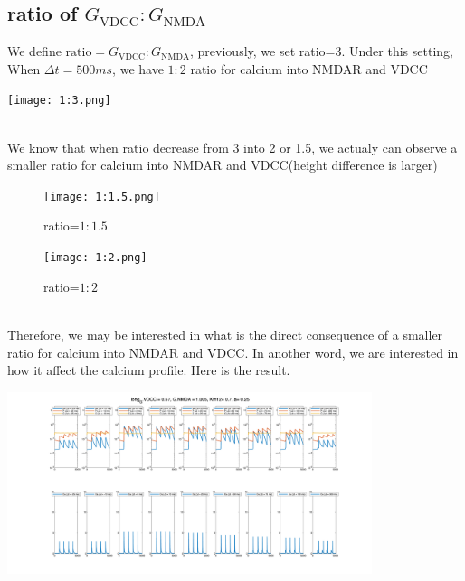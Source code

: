 \documentclass{article}
\begin{document}
\subsection{ratio of $G_{\text{VDCC}}:G_{\text{NMDA}}$}
We define $\text{ratio}=G_{\text{VDCC}}:G_{\text{NMDA}}$, previously, we set ratio=3. Under this setting, When $\Delta t=500ms$, we have $1:2$ ratio for calcium into NMDAR and VDCC\\
\begin{minipage}{\textwidth} %
    \centering
    \texttt{[image: 1:3.png]} %
    \label{fig:a0.25}
\end{minipage}\\
We know that when ratio decrease from 3 into 2 or 1.5, we actualy can observe a smaller ratio for calcium into NMDAR and VDCC(height difference is larger)\\
\begin{figure}[h]
    \centering
    \begin{minipage}[b]{0.45\textwidth}
        \texttt{[image: 1:1.5.png]}
        \caption{ratio=$1:1.5$}
        \label{fig:image1}
    \end{minipage}
    \hfill %
    \begin{minipage}[b]{0.45\textwidth}
        \texttt{[image: 1:2.png]}
        \caption{ratio=$1:2$}
        \label{fig:image2}
    \end{minipage}
\end{figure}\\
Therefore, we may be interested in what is the direct consequence of a smaller ratio for calcium into NMDAR and VDCC. In another word, we are interested in how it affect the calcium profile. Here is the result.
\\
\begin{minipage}{\textwidth} %
    \centering
    \includegraphics[width=0.8\textwidth]{short_G_VDCC=0.67_G_NMDA=1.00_Km12=0.700_a=0.25.png} %
    \label{fig:a0.25}
\end{minipage}
\end{document}
